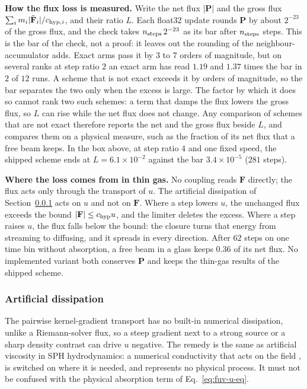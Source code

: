 \textbf{How the flux loss is measured.} Write the net flux $|\mathbf P|$
and the gross flux $\sum_i m_i|\tilde{\mathbf F}_i|/c_{{\rm hyp},i}$, and
their ratio $L$. Each float32 update rounds $\mathbf P$ by about
$2^{-23}$ of the gross flux, and the check takes $n_{\rm steps}\,2^{-23}$
as its bar after $n_{\rm steps}$ steps. This is the bar of the check, not
a proof: it leaves out the rounding of the neighbour-accumulator adds.
Exact arms pass it by $3$ to $7$ orders of magnitude, but on several
ranks at step ratio $2$ an exact arm has read $1.19$ and $1.37$ times
the bar in $2$ of $12$ runs. A scheme that is not exact exceeds it by
orders of magnitude, so the bar separates the two only when the excess
is large. The factor by which it does so cannot
rank two such schemes: a term that damps the flux lowers the gross flux,
so $L$ can rise while the net flux does not change. Any comparison
of schemes that are not exact therefore reports the net and the gross
flux beside $L$, and compares them on a physical measure, such as the
fraction of its net flux that a free beam keeps. In the box above, at
step ratio $4$ and one fixed speed, the shipped scheme ends at
$L = 6.1\times10^{-2}$ against the bar
$3.4\times10^{-5}$ ($281$ steps).

\textbf{Where the loss comes from in thin gas.} No coupling reads
$\mathbf F$ directly; the flux acts only through the transport of $u$.
The artificial dissipation of Section~\ref{sec:fuv-dissipation} acts on
$u$ and not on $\mathbf F$. Where a step lowers $u$, the unchanged flux
exceeds the bound $|\mathbf F| \le c_{\rm hyp}u$, and the limiter deletes
the excess. Where a step raises $u$, the flux falls below the bound: the
closure turns that energy from streaming to diffusing, and it spreads in
every direction. After $62$ steps on one time bin without absorption, a free beam in a glass keeps $0.36$ of its net flux.
No implemented variant both conserves $\mathbf P$ and keeps the
thin-gas results of the shipped scheme.

\subsubsection{Artificial dissipation}
\label{sec:fuv-dissipation}

The pairwise kernel-gradient transport has no built-in numerical
dissipation, unlike a Riemann-solver flux, so a steep gradient next to
a strong source or a sharp density contrast can drive $u$ negative.
The remedy is the same as artificial viscosity in SPH hydrodynamics: a
numerical conductivity that acts on the field
\citep{ClearyMonaghan1999,Price2008}, is switched on where it is needed,
and represents no physical process. It must not be confused
with the physical absorption term of Eq.~\ref{eq:fuv-u-eq}.

